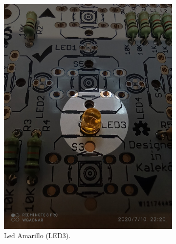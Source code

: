 \documentclass{article}
\begin{document}
\begin{figure}[H]
    \centering
    \begin{subfigure}[t]{0.3\textwidth}
        \centering
        \includegraphics[width=0.9\columnwidth, height=1.2\columnwidth]{images/Botonera/led1.jpg}
        \caption{Led Amarillo (LED3).}
        \label{fig:botonera_led1}
    \end{subfigure}%
    \begin{subfigure}[t]{0.3\textwidth}
        \centering

\end{subfigure}
\end{figure}
\end{document}
